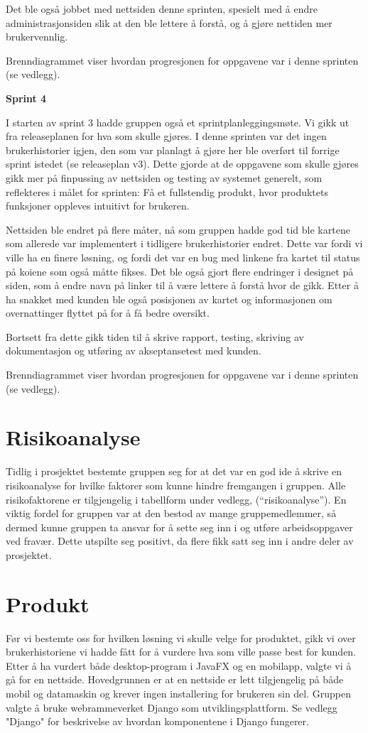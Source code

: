 \documentclass[12pt,a4paper,norsk]{article}
\begin{document}
Det ble også jobbet med nettsiden denne sprinten, spesielt med å endre administrasjonsiden slik at den ble lettere å forstå, og å gjøre nettiden mer brukervennlig.  

Brenndiagrammet viser hvordan progresjonen for oppgavene var i denne sprinten (se vedlegg).

\bigskip \noindent \textbf{Sprint 4}
\par I starten av sprint 3 hadde gruppen også et sprintplanleggingsmøte. Vi gikk ut fra releaseplanen for hva som skulle gjøres. I denne sprinten var det ingen brukerhistorier igjen, den som var planlagt å gjøre her ble overført til forrige sprint istedet (se releaseplan v3). Dette gjorde at de oppgavene som skulle gjøres gikk mer på finpussing av nettsiden og testing av systemet generelt, som reflekteres i målet for sprinten: Få et fullstendig produkt, hvor produktets funksjoner oppleves intuitivt for brukeren.

Nettsiden ble endret på flere måter, nå som gruppen hadde god tid ble kartene som allerede var implementert i tidligere brukerhistorier endret. Dette var fordi vi ville ha en finere løsning, og fordi det var en bug med linkene fra kartet til status på koiene som også måtte fikses. Det ble også gjort flere endringer i designet på siden, som å endre navn på linker til å være lettere å forstå hvor de gikk. Etter å ha snakket med kunden ble også posisjonen av kartet og informasjonen om overnattinger flyttet på for å få bedre oversikt. 

Bortsett fra dette gikk tiden til å skrive rapport, testing, skriving av dokumentasjon og utføring av akseptansetest med kunden. 

Brenndiagrammet viser hvordan progresjonen for oppgavene var i denne sprinten (se vedlegg).

	
	\section{Risikoanalyse}
	Tidlig i prosjektet bestemte gruppen seg for at det var en god ide å skrive en risikoanalyse for hvilke faktorer som kunne hindre fremgangen i gruppen. Alle risikofaktorene er tilgjengelig i tabellform under vedlegg, (“risikoanalyse”). En viktig fordel for gruppen var at den bestod av mange gruppemedlemmer, så dermed kunne gruppen ta ansvar for å sette seg inn i og utføre arbeidsoppgaver ved fravær. Dette utspilte seg positivt, da flere fikk satt seg inn i andre deler av prosjektet.
	
	\section{Produkt}
	Før vi bestemte oss for hvilken løsning vi skulle velge for produktet, gikk vi over brukerhistoriene vi hadde fått for å vurdere hva som ville passe best for kunden. Etter å ha vurdert både desktop-program i JavaFX og en mobilapp, valgte vi å gå for en nettside. Hovedgrunnen er at en nettside er lett tilgjengelig på både mobil og datamaskin og krever ingen installering for brukeren sin del. Gruppen valgte å bruke webrammeverket Django som utviklingsplattform. Se vedlegg "Django" for beskrivelse av hvordan komponentene i Django fungerer.
	
\end{document}
